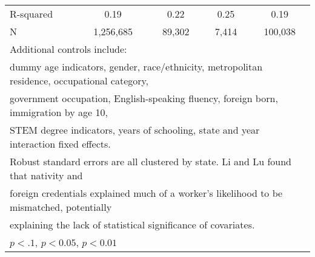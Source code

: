 \begin{table}[htbp]
\begin{tabular}{l*{4}{c}}
R-squared           &        0.19         &        0.22         &        0.25         &        0.19         \\
N                   &   1,256,685         &      89,302         &       7,414         &     100,038         \\
\bottomrule
\multicolumn{5}{l}{\footnotesize Additional controls include:}\\
\multicolumn{5}{l}{\footnotesize dummy age indicators, gender, race/ethnicity, metropolitan residence, occupational category,}\\
\multicolumn{5}{l}{\footnotesize government occupation, English-speaking fluency, foreign born, immigration by age 10,}\\
\multicolumn{5}{l}{\footnotesize STEM degree indicators, years of schooling, state and year interaction fixed effects.}\\
\multicolumn{5}{l}{\footnotesize Robust standard errors are all clustered by state. Li and Lu found that nativity and}\\
\multicolumn{5}{l}{\footnotesize foreign credentials explained much of a worker's likelihood to be mismatched, potentially}\\
\multicolumn{5}{l}{\footnotesize explaining the lack of statistical significance of covariates.}\\
\multicolumn{5}{l}{\footnotesize \sym{*} \(p<.1\), \sym{**} \(p<0.05\), \sym{***} \(p<0.01\)}\\
\end{tabular}
\end{table}
